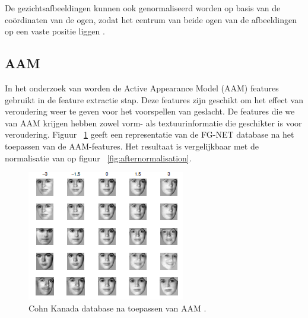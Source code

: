 De gezichtsafbeeldingen kunnen ook genormaliseerd worden op basis van de coördinaten van de ogen, zodat het centrum van beide ogen van de afbeeldingen op een vaste positie liggen \autocite{Chen2011}. 

\subsection{AAM}\label{sub:aam}
In het onderzoek van \textcite{Lakshmiprabha2016} worden de Active Appearance Model (AAM) features gebruikt in de feature extractie stap. Deze features zijn geschikt om het effect van veroudering weer te geven voor het voorspellen van geslacht. De features die we van AAM krijgen hebben zowel vorm- als textuurinformatie die geschikter is voor veroudering. Figuur {~\ref{fig:aam}} geeft een representatie van de FG-NET database na het toepassen van de AAM-features. Het resultaat is vergelijkbaar met de normalisatie van \textcite{Chen2011} op figuur {~\ref{fig:afternormalisation}}.
\begin{figure}
    \centering
    \includegraphics{graphics/AAM.PNG}
    \caption[AAM-features]{Cohn Kanada database na toepassen van AAM \autocite{Lakshmiprabha2016}.
        \label{fig:aam}}
\end{figure} 

